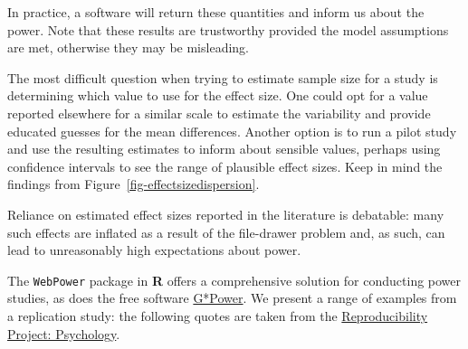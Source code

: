 \documentclass[
  11pt,
  letterpaper,
]{scrbook}
\theoremstyle{definition}
\theoremstyle{definition}
\theoremstyle{remark}
\begin{document}
In practice, a software will return these quantities and inform us about
the power. Note that these results are trustworthy provided the model
assumptions are met, otherwise they may be misleading.

The most difficult question when trying to estimate sample size for a
study is determining which value to use for the effect size. One could
opt for a value reported elsewhere for a similar scale to estimate the
variability and provide educated guesses for the mean differences.
Another option is to run a pilot study and use the resulting estimates
to inform about sensible values, perhaps using confidence intervals to
see the range of plausible effect sizes. Keep in mind the findings from
Figure~\ref{fig-effectsizedispersion}.

Reliance on estimated effect sizes reported in the literature is
debatable: many such effects are inflated as a result of the file-drawer
problem and, as such, can lead to unreasonably high expectations about
power.

The \texttt{WebPower} package in \textbf{R} offers a comprehensive
solution for conducting power studies, as does the free software
\href{https://www.psychologie.hhu.de/arbeitsgruppen/allgemeine-psychologie-und-arbeitspsychologie/gpower}{G*Power}.
We present a range of examples from a replication study: the following
quotes are taken from the \href{https://osf.io/ezcuj/}{Reproducibility
Project: Psychology}.
\end{document}
